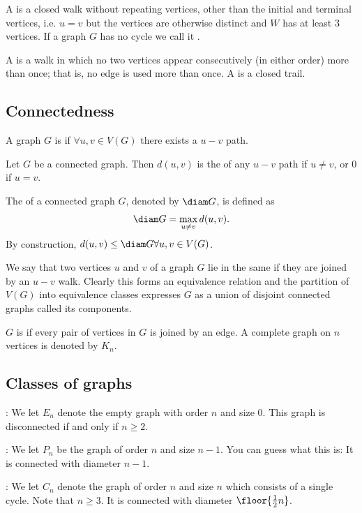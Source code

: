A  is a closed walk without repeating vertices, other than the initial and terminal vertices, i.e. $u=v$ but the vertices are otherwise distinct and $W$ has at least 3 vertices. If a graph $G$ has no cycle we call it .

A  is a walk in which no two vertices appear consecutively (in either order) more than once; that is, no edge is used more than once. A  is a closed trail.

\subsection{Connectedness}
\begin{definition}
A graph $G$ is  if $\forall u,v \in V(G)$ there exists a $u-v$ path.
\end{definition}

Let $G$ be a connected graph. Then $d(u,v)$ is the  of any $u-v$ path if $u \neq v$, or 0 if $u=v$.

The  of a connected graph $G$, denoted by $\diam G$, is defined as
\[ \diam G = \max_{u\neq v} d(u,v). \]
By construction, $d(u,v) \le \diam G \forall u,v \in V(G)$.

We say that two vertices $u$ and $v$ of a graph $G$ lie in the same  if they are joined by an $u-v$ walk. Clearly this forms an equivalence relation and the partition of $V(G)$ into equivalence classes expresses $G$ as a union of disjoint connected graphs called its components.

$G$ is  if every pair of vertices in $G$ is joined by an edge. A complete graph on $n$ vertices is denoted by $K_n$.

\subsection{Classes of graphs}
: We let $E_n$ denote the empty graph with order $n$ and size 0. This graph is disconnected if and only if $n \ge 2$.

: We let $P_n$ be the graph of order $n$ and size $n-1$. You can guess what this is: It is connected with diameter $n-1$.

: We let $C_n$ denote the graph of order $n$ and size $n$ which consists of a single
cycle. Note that $n \ge 3$. It is connected with diameter $\floor{\frac{1}{2}n}$.

